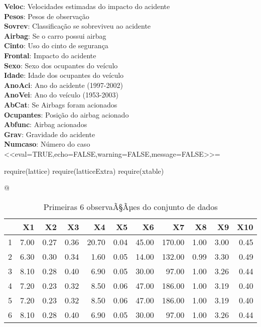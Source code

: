 \documentclass[a4paper]{article} %
\begin{document}
\noindent\textbf{Veloc}: Velocidades estimadas do impacto do acidente\\
\textbf{Pesos}: Pesos de observação\\
\textbf{Sovrev}: Classificação se sobreviveu ao acidente\\
\textbf{Airbag}: Se o carro possui airbag\\
\textbf{Cinto}: Uso do cinto de segurança\\
\textbf{Frontal}: Impacto do acidente\\
\textbf{Sexo}: Sexo dos ocupantes do veículo\\
\textbf{Idade}: Idade dos ocupantes do veículo\\
\textbf{AnoAci}: Ano do acidente (1997-2002)\\
\textbf{AnoVei}: Ano do veículo (1953-2003)\\
\textbf{AbCat}: Se Airbags foram acionados\\
\textbf{Ocupantes}: Posição do airbag acionado\\
\textbf{Abfunc}: Airbag acionados\\
\textbf{Grav}: Gravidade do acidente\\
\textbf{Numcaso}: Número do caso\\


<<eval=TRUE,echo=FALSE,warning=FALSE,message=FALSE>>=

require(lattice)
require(latticeExtra)
require(xtable)


@

\begin{table}[ht]
\centering
\caption{Primeiras 6 observaÃ§Ãµes do conjunto de dados}
\begin{tabular}{rrrrrrrrrrr}
  \hline
 & X1 & X2 & X3 & X4 & X5 & X6 & X7 & X8 & X9 & X10 \\ 
  \hline
1 & 7.00 & 0.27 & 0.36 & 20.70 & 0.04 & 45.00 & 170.00 & 1.00 & 3.00 & 0.45 \\ 
  2 & 6.30 & 0.30 & 0.34 & 1.60 & 0.05 & 14.00 & 132.00 & 0.99 & 3.30 & 0.49 \\ 
  3 & 8.10 & 0.28 & 0.40 & 6.90 & 0.05 & 30.00 & 97.00 & 1.00 & 3.26 & 0.44 \\ 
  4 & 7.20 & 0.23 & 0.32 & 8.50 & 0.06 & 47.00 & 186.00 & 1.00 & 3.19 & 0.40 \\ 
  5 & 7.20 & 0.23 & 0.32 & 8.50 & 0.06 & 47.00 & 186.00 & 1.00 & 3.19 & 0.40 \\ 
  6 & 8.10 & 0.28 & 0.40 & 6.90 & 0.05 & 30.00 & 97.00 & 1.00 & 3.26 & 0.44 \\ 
   \hline
\end{tabular}
\end{table}
\end{document}
